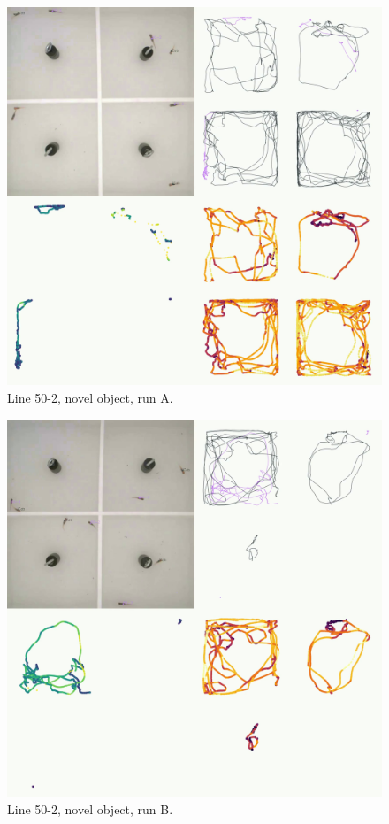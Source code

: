 \documentclass[
]{book}
\begin{document}
\begin{figure}
\includegraphics[width=1\linewidth]{figs/mikk_behaviour/four_panel_plots/novel_object_20191114_1305_50-2_R_A_300} \caption{Line 50-2, novel object, run A.}\label{fig:4p-50-2-no-A}
\end{figure}



\begin{figure}
\includegraphics[width=1\linewidth]{figs/mikk_behaviour/four_panel_plots/novel_object_20191116_1438_50-2_R_B_300} \caption{Line 50-2, novel object, run B.}\label{fig:4p-50-2-no-B}
\end{figure}
\end{document}
